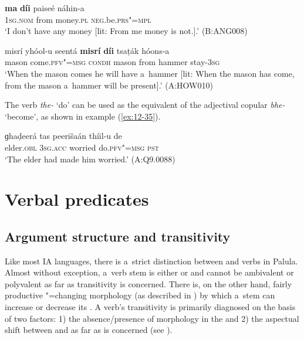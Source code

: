 \begin{exe}
\ex
\label{ex:12-33}
\gll \textbf{ma} \textbf{díi} paiseé náhin-a \\
\textsc{1sg.nom} from money.\textsc{pl} \textsc{neg}.be.\textsc{prs"=mpl} \\
\glt `I don't have any money [lit: From me money is not.].' (B:ANG008)
\end{exe}
\begin{exe}
\ex
\label{ex:12-34}
\gll misrí yhóol-u seentá \textbf{misrí} \textbf{díi} tsaṭák hóons-a \\
mason come.\textsc{pfv"=msg} \textsc{condh} mason from hammer stay-\textsc{3sg} \\
\glt `When the mason comes he will have a~hammer [lit: When the mason has come, from the mason a~hammer will be present].' (A:HOW010)
\end{exe}

 The verb \textit{the-} `do' can be used as the  equivalent of the adjectival copular \textit{bhe-} `become', as shown in example (\ref{ex:12-35}).

\begin{exe}
\ex
\label{ex:12-35}
\gll ɡhaḍeerá tas peerišaán thíil-u de \\
elder.\textsc{obl} \textsc{3sg.acc} worried do.\textsc{pfv"=msg} \textsc{pst} \\
\glt `The elder had made him worried.' (A:Q9.0088)
\end{exe}

\section{Verbal predicates}
\label{sec:12-2}

\subsection{Argument structure and transitivity}
\label{subsec:12-2-1}


Like most IA languages, there is a~strict distinction between  and  verbs in Palula. Almost without exception, a~verb stem is either  or  and cannot be ambivalent or polyvalent as far as transitivity is concerned. There is, on the other hand, fairly productive "=changing morphology (as described in ) by which a~stem can increase or decrease its . A verb's transitivity is primarily diagnosed on the basis of two factors: 1) the absence/presence of  morphology in the  and 2) the aspectual shift between   and  as far as  is concerned (see ). 



